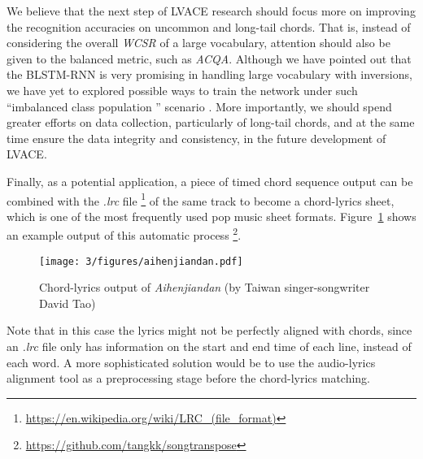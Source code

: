 We believe that the next step of LVACE research should focus more on improving the recognition accuracies on uncommon and long-tail chords. That is, instead of considering the overall \textit{WCSR} of a large vocabulary, attention should also be given to the balanced metric, such as \textit{ACQA}. Although we have pointed out that the BLSTM-RNN is very promising in handling large vocabulary with inversions, we have yet to explored possible ways to train the network under such ``imbalanced class population '' scenario \cite{chawla2004editorial}. More importantly, we should spend greater efforts on data collection, particularly of long-tail chords, and at the same time ensure the data integrity and consistency, in the future development of LVACE.

Finally, as a potential application, a piece of timed chord sequence output can be combined with the \textit{.lrc} file \footnote{\url{https://en.wikipedia.org/wiki/LRC\_(file\_format)}} of the same track to become a chord-lyrics sheet, which is one of the most frequently used pop music sheet formats. Figure~\ref{fig:3-aihenjiandan} shows an example output of this automatic process \footnote{\url{https://github.com/tangkk/songtranspose}}.
\begin{figure}[h]
    \centering
        \texttt{[image: 3/figures/aihenjiandan.pdf]}
    \caption{Chord-lyrics output of \textit{Aihenjiandan} (by Taiwan singer-songwriter David Tao)}
    \label{fig:3-aihenjiandan}
\end{figure}
Note that in this case the lyrics might not be perfectly aligned with chords, since an \textit{.lrc} file only has information on the start and end time of each line, instead of each word. A more sophisticated solution would be to use the audio-lyrics alignment tool \cite{mauch2010lyrics} as a preprocessing stage before the chord-lyrics matching.



